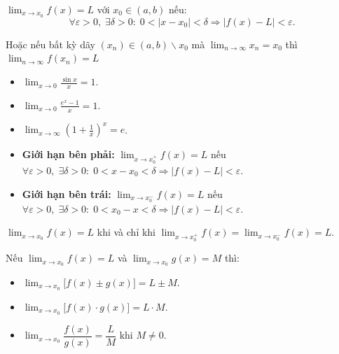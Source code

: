 \documentclass[12pt,a4paper]{article}
\begin{document}
\begin{dinhnghia}
  $\displaystyle\lim_{x \to x_0} f(x) = L$ với $x_0 \in (a, b)$ nếu:
  \[
    \forall \varepsilon > 0,\; \exists \delta > 0:\; 0 < |x - x_0| < \delta \Rightarrow |f(x) - L| < \varepsilon.
  \]

  Hoặc nếu bất kỳ dãy $(x_n) \in (a, b) \backslash {x_0}$ mà $\displaystyle\lim_{n \to \infty} x_n = x_0$ thì $\displaystyle\lim_{n \to \infty} f(x_n) = L$
\end{dinhnghia}

\begin{congthuc}[title={Giới hạn quan trọng}]
  \begin{itemize}
    \item $\displaystyle\lim_{x \to 0} \frac{\sin x}{x} = 1$.
    \item $\displaystyle\lim_{x \to 0} \frac{e^x - 1}{x} = 1$.
    \item $\displaystyle\lim_{x \to \infty} \left(1 + \frac{1}{x}\right)^x = e$.
  \end{itemize}
\end{congthuc}

\begin{dinhnghia}[title={Giới hạn một phía}]
  \begin{itemize}
    \item \textbf{Giới hạn bên phải:} $\displaystyle\lim_{x \to x_0^+} f(x) = L$ nếu $\forall \varepsilon > 0,\; \exists \delta > 0:\; 0 < x - x_0 < \delta \Rightarrow |f(x) - L| < \varepsilon$.
    \item \textbf{Giới hạn bên trái:} $\displaystyle\lim_{x \to x_0^-} f(x) = L$ nếu $\forall \varepsilon > 0,\; \exists \delta > 0:\; 0 < x_0 - x < \delta \Rightarrow |f(x) - L| < \varepsilon$.
  \end{itemize}
  $\displaystyle\lim_{x \to x_0} f(x) = L$ khi và chỉ khi $\displaystyle\lim_{x \to x_0^+} f(x) = \lim_{x \to x_0^-} f(x) = L$.
\end{dinhnghia}

\begin{tinhchat}[title={Các phép toán trên giới hạn}]
  Nếu $\displaystyle\lim_{x \to x_0} f(x) = L$ và $\displaystyle\lim_{x \to x_0} g(x) = M$ thì:
  \begin{itemize}
    \item $\displaystyle\lim_{x \to x_0} \bigl[f(x) \pm g(x)\bigr] = L \pm M$.
    \item $\displaystyle\lim_{x \to x_0} \bigl[f(x) \cdot g(x)\bigr] = L \cdot M$.
    \item $\displaystyle\lim_{x \to x_0} \dfrac{f(x)}{g(x)} = \dfrac{L}{M}$ khi $M \ne 0$.
  \end{itemize}
\end{tinhchat}
\end{document}
